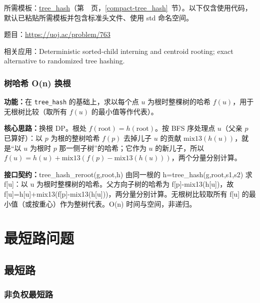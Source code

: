 所需模板：\hyperref[compact-tree_hash]{tree\_\allowbreak{}hash}（第~\pageref{compact-tree_hash}~页，\ref{compact-tree_hash}~节）。以下仅含使用代码，默认已粘贴所需模板并包含标准头文件、使用 std 命名空间。

题目：\url{https://uoj.ac/problem/763}



\Needspace{408pt}

\noindent 相关应用：Deterministic sorted-child interning and centroid rooting; exact alternative to randomized tree hashing.

\subsection{树哈希 O(n) 换根}\label{compact-tree_hash_reroot}

\noindent\textbf{功能：}\allowbreak 在 \texttt{tree\_hash} 的基础上，求以每个点 $u$ 为根时整棵树的哈希 $f(u)$，用于无根树比较（取所有 $f(u)$ 的最小值等作代表）。

\textbf{核心思路：}\allowbreak 换根 DP。根处 $f(\mathrm{root})=h(\mathrm{root})$。按 BFS 序处理点 $u$（父亲 $p$ 已算好）：以 $p$ 为根的整树哈希 $f(p)$ 去掉儿子 $u$ 的贡献 $\mathrm{mix13}(h(u))$，就是“以 $u$ 为根时 $p$ 那一侧子树”的哈希；它作为 $u$ 的新儿子，所以 $f(u)=h(u)+\mathrm{mix13}(f(p)-\mathrm{mix13}(h(u)))$，两个分量分别计算。



{\sloppy{}\noindent\textbf{接口契约：}tree\_hash\_reroot(g,root,h) 由同一根的 h=tree\_hash(g,root,s1,s2) 求 f[u]：以 u 为根时整棵树的哈希。父方向子树的哈希为 f[p]-mix13(h[u])，故 f[u]=h[u]+mix13(f[p]-mix13(h[u]))，两分量分别计算。无根树比较取所有 f[u] 的最小值（或按重心）作为整树代表。O(n) 时间与空间，非递归。\par}



\Needspace{180pt}

\chapter{最短路问题}

\section{最短路}

\subsection{非负权最短路}\label{compact-Dijkstra}

